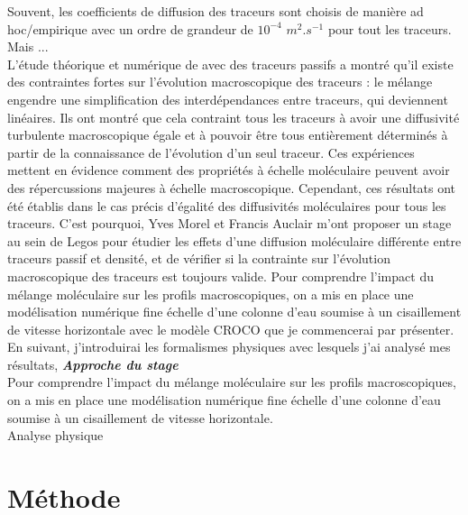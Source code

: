 \documentclass[a4paper,12pt]{article}
\begin{document}
    Souvent, les coefficients de diffusion des traceurs sont choisis de manière ad hoc/empirique avec un ordre de grandeur de $10^{-4}$ $m^2.s^{-1}$ pour tout les traceurs. Mais ... \\
    \color{black}
    L'étude théorique et numérique de \cite{penney_diapycnal_2020} avec des traceurs passifs a montré qu’il existe des contraintes fortes sur l’évolution macroscopique des traceurs : le mélange engendre une simplification des interdépendances entre traceurs, qui deviennent linéaires. Ils ont montré que cela contraint tous les traceurs à avoir une diffusivité turbulente macroscopique égale et à pouvoir être tous entièrement déterminés à partir de la connaissance de l'évolution d’un seul traceur. Ces expériences mettent en évidence comment des propriétés à échelle moléculaire peuvent avoir des répercussions majeures à échelle macroscopique. Cependant, ces résultats ont été établis dans le cas précis d’égalité des diffusivités moléculaires pour tous les traceurs. C'est pourquoi, Yves Morel et Francis Auclair m'ont proposer un stage au sein de Legos pour étudier les effets d’une diffusion moléculaire différente entre traceurs passif et densité, et de vérifier si la contrainte sur l'évolution macroscopique des traceurs est toujours valide. %
    Pour comprendre l'impact du mélange moléculaire sur les profils macroscopiques, on a mis en place une modélisation numérique fine échelle d'une colonne d'eau soumise à un cisaillement de vitesse horizontale avec le modèle CROCO que je commencerai par présenter. En suivant, j'introduirai les formalismes physiques avec lesquels j'ai analysé mes résultats,
    \newline
    \textbf{\textit{Approche du stage}} \\
    
    \color{blue}
    Pour comprendre l'impact du mélange moléculaire sur les profils macroscopiques, on a mis en place une modélisation numérique fine échelle d'une colonne d'eau soumise à un cisaillement de vitesse horizontale. \\ Analyse physique
    \color{black}

\newpage
\section{Méthode}
\end{document}
